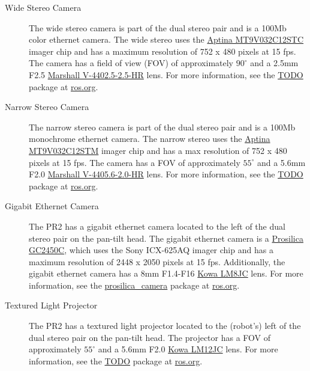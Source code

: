 \begin{description}
\label{stereo camera}
\item[Wide Stereo Camera] The wide stereo camera is part of the dual stereo pair
  and is a 100Mb color ethernet camera. The wide stereo uses the
  \href{http://www.aptina.com/products/image_sensors/mt9v032c12stc/#overview}{Aptina
    MT9V032C12STC} imager chip and has a maximum resolution of 752 x 480 pixels
  at 15 fps. The camera has a field of view (FOV) of approximately $90^\circ$
  and a 2.5mm F2.5
  \href{http://www.mars-cam.com/lenses/ccd_cmos/Technology%20Report(V-4402.5-2.5-HR).pdf}{Marshall
    V-4402.5-2.5-HR} lens. For more information, see the
  \href{http://www.ros.org/wiki/wge100_camera}{TODO} package at
  \href{http://www.ros.org}{ros.org}.

\item[Narrow Stereo Camera] The narrow stereo camera is part of the dual stereo
  pair and is a 100Mb monochrome ethernet camera.  The narrow stereo uses the
  \href{http://www.aptina.com/products/image_sensors/mt9v032c12stm/#overview}{Aptina
    MT9V032C12STM} imager chip and has a max resolution of 752 x 480 pixels at
  15 fps. The camera has a FOV of approximately $55^\circ$ and a 5.6mm F2.0
  \href{http://www.mars-cam.com/lenses/ccd_cmos/Technology%20Report(V-4405.6-2.0-HR).pdf}{Marshall
    V-4405.6-2.0-HR} lens. For more information, see the
  \href{http://www.ros.org/wiki/wge100_camera}{TODO} package at
  \href{http://www.ros.org}{ros.org}.

\item[Gigabit Ethernet Camera]
\label{ethernet camera}
The PR2 has a gigabit ethernet camera located to the left of the dual stereo
pair on the pan-tilt head.  The gigabit ethernet camera is a
\href{http://www.prosilica.com/products/gc2450.html}{Prosilica GC2450C}, which
uses the Sony ICX-625AQ imager chip and has a maximum resolution of 2448 x 2050
pixels at 15 fps.  Additionally, the gigabit ethernet camera has a 8mm F1.4-F16
\href{http://www.kowascope.com/frontend/proddetail.asp?pn=LM8JC&co=10000348}{Kowa
  LM8JC} lens. For more information, see the
\href{http://www.ros.org/wiki/prosilica_camera}{prosilica\_camera} package at
\href{http://www.ros.org}{ros.org}.

\item[Textured Light Projector]
\label{texture projector}
The PR2 has a textured light projector located to the (robot's) left of the dual
stereo pair on the pan-tilt head.  The projector has a FOV of approximately
$55^\circ$ and a 5.6mm F2.0
\href{http://www.kowascope.com/frontend/proddetail.asp?pn=LM12JC&co=10000348}{Kowa
  LM12JC} lens.  For more information, see the
\href{http://www.ros.org/wiki/TODO}{TODO} package at
\href{http://www.ros.org}{ros.org}.

\end{description}

